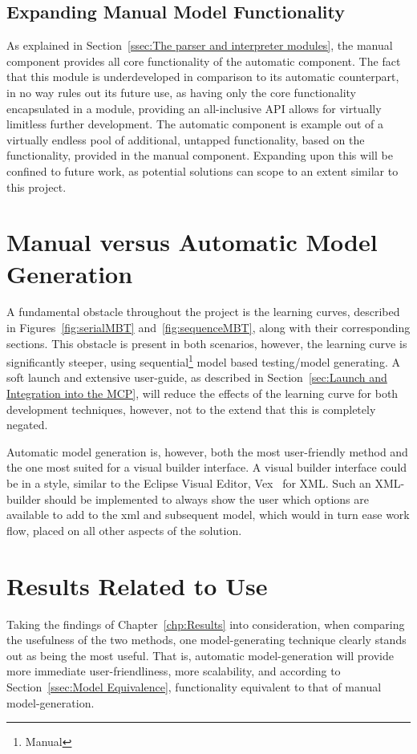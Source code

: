 \subsection{Expanding Manual Model Functionality}
As explained in Section~\ref{ssec:The parser and interpreter modules}, the manual component provides all core functionality of the automatic component. The fact that this module is underdeveloped in comparison to its automatic counterpart, in no way rules out its future use, as having only the core functionality encapsulated in a module, providing an all-inclusive API allows for virtually limitless further development. The automatic component is  example out of a virtually endless pool of additional, untapped functionality, based on the functionality, provided in the manual component. Expanding upon this will be confined to future work, as potential solutions can scope to an extent similar to this project.

\section{Manual versus Automatic Model Generation}
A fundamental obstacle throughout the project is the learning curves, described in Figures~\ref{fig:serialMBT} and~\ref{fig:sequenceMBT}, along with their corresponding sections. This obstacle is present in both scenarios, however, the learning curve is significantly steeper, using sequential\footnote{Manual} model based testing/model generating. A soft launch and extensive user-guide, as described in Section~\ref{sec:Launch and Integration into the MCP}, will reduce the effects of the learning curve for both development techniques, however, not to the extend that this is completely negated.

Automatic model generation is, however, both the most user-friendly method and the one most suited for a visual builder interface. A visual builder interface could be in a style, similar to the Eclipse Visual Editor, Vex~\cite{vex} for XML. Such an XML-builder should be implemented to always show the user which options are available to add to the xml and subsequent model, which would in turn ease work flow, placed on all other aspects of the solution.

\section{Results Related to Use}
Taking the findings of Chapter~\ref{chp:Results} into consideration, when comparing the usefulness of the two methods, one model-generating technique clearly stands out as being the most useful. That is, automatic model-generation will provide more immediate user-friendliness, more scalability, and according to Section~\ref{ssec:Model Equivalence}, functionality equivalent to that of manual model-generation.

